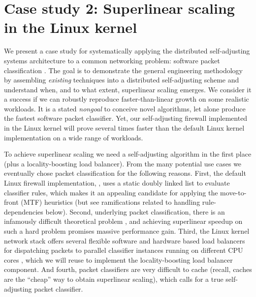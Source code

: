 \section{Case study 2: Superlinear scaling\\ in the Linux kernel}\label{sec:dist-classifier}

We present a case study for systematically applying the distributed self-adjusting systems architecture to a common networking problem: software packet classification \cite{gupta2001algorithms}. The goal is to demonstrate the general engineering methodology by assembling \emph{existing} techniques into a distributed self-adjusting scheme and understand when, and to what extent, superlinear scaling emerges. We consider it a success if we can robustly reproduce faster-than-linear growth on some realistic workloads. It is a stated \emph{nongoal} to conceive novel algorithms, let alone produce the fastest software packet classifier. %
Yet, our self-adjusting firewall implemented in the Linux kernel will prove several times faster than the default Linux kernel implementation on a wide range of workloads.

To achieve superlinear scaling we need a self-adjusting algorithm in the first place (plus a locality-boosting load balancer). From the many potential use cases %
\cite{SleatorT85Splay, BentleyCL93, HesterH85, HesterH85, BentleySTW86, Avin0020, ParkM12} we eventually chose packet classification for the following reasons.  First, the default Linux firewall implementation, \nftables, uses a static doubly linked list to evaluate classifier rules, which makes it an appealing candidate for applying the move-to-front (MTF) heuristics (but see ramifications related to handling rule-dependencies below). %
Second, underlying packet classification, there is an infamously difficult theoretical problem \cite{10.1145/2619239.2626294,10.1006/jagm.1996.0063, PacutVAPRS2022, 10.1145/2619239.2626294, 10.1145/1851182.1851208, 10.1145/863955.863980, gupta2001algorithms}, %
and achieving superlinear speedup on such a hard problem promises massive performance gain. Third, the Linux kernel network stack offers several flexible software and hardware based load balancers for dispatching packets to parallel classifier instances running on different CPU cores \cite{rss-linux}, which we will reuse to implement the locality-boosting load balancer component. And fourth, packet classifiers are very difficult to cache \cite{1354643} (recall, caches are the ``cheap'' way to obtain superlinear scaling), which calls for a true self-adjusting packet classifier. %

